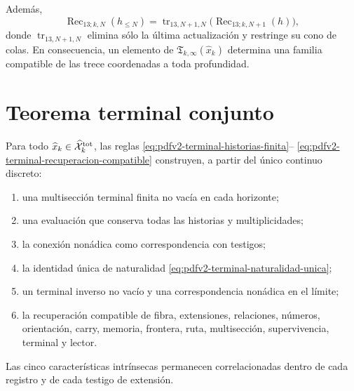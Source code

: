 Adem\'as,
\begin{equation}
\label{eq:pdfv2-terminal-recuperacion-compatible}
 \operatorname{Rec}_{13;k,N}(h_{\leq N})
 =\operatorname{tr}_{13,N+1,N}
   \bigl(\operatorname{Rec}_{13;k,N+1}(h)\bigr),
\end{equation}
donde \(\operatorname{tr}_{13,N+1,N}\) elimina s\'olo la \'ultima
actualizaci\'on y restringe su cono de colas. En consecuencia, un elemento
de \(\mathfrak T_{k,\infty}(\widehat x_k)\) determina una familia compatible de las
trece coordenadas a toda profundidad.

\section{Teorema terminal conjunto}

\begin{theorem}
\label{thm:pdfv2-terminal-conjunto}
Para todo \(\widehat x_k\in\widehat{\mathcal X}^{\rm tot}_k\), las reglas
\eqref{eq:pdfv2-terminal-historias-finita}--
\eqref{eq:pdfv2-terminal-recuperacion-compatible} construyen, a partir del
\'unico continuo discreto:
\begin{enumerate}
 \item una multisecci\'on terminal finita no vac\'ia en cada horizonte;
 \item una evaluaci\'on que conserva todas las historias y multiplicidades;
 \item la conexi\'on non\'adica como correspondencia con testigos;
 \item la identidad \'unica de naturalidad
       \eqref{eq:pdfv2-terminal-naturalidad-unica};
 \item un terminal inverso no vac\'io y una correspondencia non\'adica en el
       l\'imite;
 \item la recuperaci\'on compatible de fibra, extensiones, relaciones,
       n\'umeros, orientaci\'on, carry, memoria, frontera, ruta,
       multisecci\'on, supervivencia, terminal y lector.
\end{enumerate}
Las cinco caracter\'isticas intr\'insecas permanecen correlacionadas dentro
de cada registro y de cada testigo de extensi\'on.
\end{theorem}

